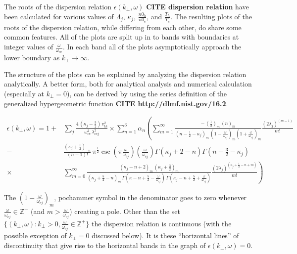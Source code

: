 \documentclass[12pt,a4paper]{article}
\begin{document}
    The roots of the dispersion relation $\epsilon(k_\perp, \omega)$ \textbf{CITE dispersion relation} have been calculated for various values of $\Lambda_j$, $\kappa_j$, $\frac{n0_h}{n0_e}$, and $\frac{T_h}{T_c}$.
    The resulting plots of the roots of the dispersion relation, while differing from each other, do share some common features.
    All of the plots are split up in to bands with boundaries at integer values of $\frac{\omega}{\omega_{ce}}$.
    In each band all of the plots asymptotically approach the lower boundary as $k_\perp \rightarrow \infty$.

    The structure of the plots can be explained by analyzing the dispersion relation analytically.
    A better form, both for analytical analysis and numerical calculation (especially at $k_\perp = 0$), can be derived by using the series definition of the generalized hypergeometric function \textbf{CITE http://dlmf.nist.gov/16.2}.

    \begin{align}
        \epsilon(k_\perp, \omega) = 1 +& \sum_j \frac{4 \, (\kappa_j - \frac{3}{2}) \, v^2_{th}}{\omega^2_{ce} \, \lambda^2_{\nu c j}} \times \sum_{n = 1}^3 \alpha_n \left( \sum_{m = 1}^\infty \frac{ -\, (\frac{1}{2})_m \, (n)_m }{(n - \frac{1}{2} - \kappa_j)_m \, (1 - \frac{\omega}{\omega_{cj}})_m (1 + \frac{\omega}{\omega_{cj}})_m } \frac{(2 \lambda_j)^{(m - 1)}}{m!} \right. \\
        -& \left. \frac{(\kappa_j + \frac{1}{2})_{-n}}{(n - 1)!} \, \pi^{\frac{1}{2}} \csc\left(\pi \frac{\omega}{\omega_{cj}}\right) \left(\frac{\omega}{\omega_{cj}}\right) \Gamma(\kappa_j + 2 - n) \Gamma(n - \frac{3}{2} - \kappa_j) \right.\\
        \times& \left. \sum_{m = 0}^\infty \frac{(\kappa_j - n + 2)_m \, (\kappa_j + \frac{3}{2})_m}{(\kappa_j + \frac{5}{2} - n)_m \, \Gamma(\kappa - n + \frac{5}{2} - \frac{\omega}{\omega_{cj}}) \, \Gamma(\kappa_j - n + \frac{5}{2} + \frac{\omega}{\omega_{cj}})} \frac{(2 \lambda_j)^{(\kappa_j + \frac{1}{2} - n + m)}}{m!} \right)
    \end{align}

    The $(1 - \frac{\omega}{\omega_{cj}})_m$, pochammer symbol in the denominator goes to zero whenever $\frac{\omega}{\omega_{cj}} \in \mathbb{Z}^+$ (and $m > \frac{\omega}{\omega_{cj}}$) creating a pole.
    Other than the set $\{(k_\perp, \omega) : k_\perp > 0, \frac{\omega}{\omega_{cj}} \in \mathbb{Z}^+\}$ the dispersion relation is continuous (with the possible exception of $k_\perp = 0$ discussed below).
    It is these ``horizontal lines'' of discontinuity that give rise to the horizontal bands in the graph of $\epsilon(k_\perp, \omega) = 0$.
\end{document}

